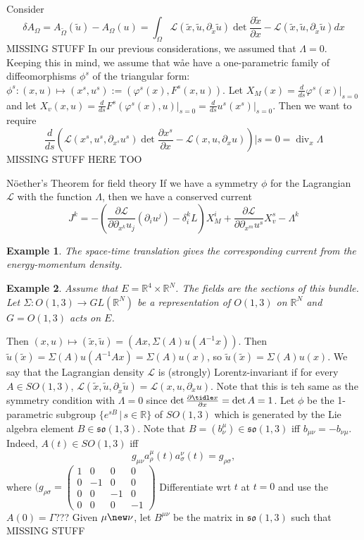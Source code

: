 \documentclass{article}
\newcommand{\R}{\mathbb R}
\newcommand{\curlyL}{\mathcal L}
\newcommand{\nl}{\newline\newline\noindent}
\newcommand{\vhi}{\varphi}
\newcommand{\pdof}[2]{\frac{\partial #1}{\partial #2}}
\DeclareMathOperator{\Div}{div}
\newtheorem{ex}{Example}
\begin{document}
Consider 
\[\delta A_{\Omega} = A_{\tilde \Omega}(\tilde u) - A_\Omega(u) = \int_\Omega \curlyL(\tilde x,\tilde u,\partial_{\tilde x}\tilde u)\det\frac{\partial \tilde x}{\partial x} - \curlyL(\tilde x,\tilde u,\partial_{\tilde x}\tilde u) dx\]
MISSING STUFF
\nl
In our previous considerations, we assumed that $\Lambda = 0$. Keeping this in mind, we assume that wåe have a one-parametric family of diffeomorphisms $\phi^s$ of the triangular form: $\phi^s:(x,u)\mapsto (x^s,u^s):=(\vhi^s(x),F^s(x,u))$. Let $X_M(x) = \frac{d}{ds}\vhi^s(x)\big|_{s=0}$ and let $X_v(x,u) = \frac{d}{ds}F^s(\vhi^s(x),u)\big|_{s=0} = \frac{d}{ds}u^s(x^s)\big|_{s=0}$. Then we want to require
\[\frac{d}{ds}\left(\curlyL(x^s, u^s,\partial_{x^s}u^s)\det\pdof{x^s}{x} - \curlyL(x,u,\partial_xu)\right)\big|s=0 = \Div_x\Lambda\]
MISSING STUFF HERE TOO
\begin{theorem}{N\"oether's Theorem for field theory}
    If we have a symmetry $\phi$ for the Lagrangian $\curlyL$ with the function $\Lambda$, then we have a conserved current
    \[J^k = -\left(\pdof{\curlyL}{\partial_{x^k}u_j}(\partial_iu^j) - \delta^k_iL\right)X^i_M + \pdof{\curlyL}{\partial_{x^m}u^s}X^s_v - \Lambda^k\]
\end{theorem}
\begin{ex}
    The space-time translation gives the corresponding current from the energy-momentum density.
\end{ex}
\begin{ex}
    Assume that $E=\R^4\times \R^N$. The fields are the sections of this bundle. Let $\Sigma: O(1,3)\to GL(\R^N)$ be a representation of $O(1,3)$ on $\R^N$ and $G = O(1,3)$ acts on $E$.
\end{ex}
Then $(x,u)\mapsto (\tilde x,\tilde u) = (Ax,\Sigma(A)u(A^{-1}x))$. Then $\tilde u(\tilde x) = \Sigma(A)u(A^{-1}Ax) = \Sigma(A)u(x)$, so $\tilde u(\tilde x) = \Sigma(A)u(x)$.
\nl
We say that the Lagrangian density $\curlyL$ is (strongly) Lorentz-invariant if for every $A\in SO(1,3)$, $\curlyL(\tilde x,\tilde u,\partial_{\tilde x}\tilde u) = \curlyL(x,u,\partial_x u)$. Note that this is teh same as the symmetry condition with $\Lambda = 0$ since $\det\pdof{\tidle x}{x} = \det A = 1$. Let $\phi$ be the 1-parametric subgroup $\{e^{sB}\,|\,s\in\R\}$ of $SO(1,3)$ which is generated by the Lie algebra element $B\in \mathfrak{so}(1,3)$. Note that $B = (b^\mu_\nu)\in \mathfrak{so}(1,3)$ iff $b_{\mu\nu} = -b_{\nu\mu}$. Indeed, $A(t)\in SO(1,3)$ iff 
\[g_{\mu\nu}a^\mu_\rho(t)a^\nu_\sigma(t) = g_{\rho\sigma},\]
where $(g_{\rho\sigma} = \begin{pmatrix}
    1 & 0 & 0 & 0 \\
    0 & -1 & 0 & 0 \\
    0 & 0 & -1 & 0\\
    0 & 0 & 0 & -1
\end{pmatrix}$
Differentiate wrt $t$ at $t=0$ and use the $A(0) = \Gamma$???
Given $\mu\new\nu$, let $B^{\mu\nu}$ be the matrix in $\mathfrak{so}(1,3)$ such that MISSING STUFF
\end{document}
